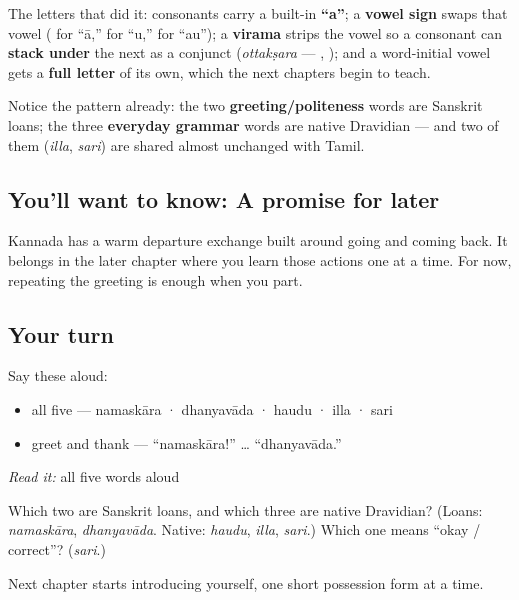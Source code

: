 The letters that did it: consonants carry a built-in \textbf{\textquotedblleft{}a\textquotedblright{}}; a \textbf{vowel sign} swaps that vowel ( for \textquotedblleft{}ā,\textquotedblright{}  for \textquotedblleft{}u,\textquotedblright{}  for \textquotedblleft{}au\textquotedblright{}); a \textbf{virama} strips the vowel so a consonant can \textbf{stack under} the next as a conjunct (\emph{ottakṣara} — , ); and a word-initial vowel gets a \textbf{full letter} of its own, which the next chapters begin to teach.

Notice the pattern already: the two \textbf{greeting/politeness} words are Sanskrit loans; the three \textbf{everyday grammar} words are native Dravidian — and two of them (\emph{illa}, \emph{sari}) are shared almost unchanged with Tamil.

\subsection*{You'll want to know: A promise for later}
Kannada has a warm departure exchange built around going and coming back. It belongs in the later chapter where you learn those actions one at a time. For now, repeating the greeting is enough when you part.

\subsection*{Your turn}
Say these aloud:

\begin{itemize}
\raggedright
  \item all five — namaskāra · dhanyavāda · haudu · illa · sari
  \item greet and thank — \textquotedblleft{}namaskāra!\textquotedblright{} … \textquotedblleft{}dhanyavāda.\textquotedblright{}
\end{itemize}

\begin{tcolorbox}[breakable,colback=teal!4,colframe=teal!35!black,title={Before you move on}]
\emph{Read it:} all five words aloud

Which two are Sanskrit loans, and which three are native Dravidian? (Loans: \emph{namaskāra}, \emph{dhanyavāda}. Native: \emph{haudu}, \emph{illa}, \emph{sari}.) Which one means \textquotedblleft{}okay / correct\textquotedblright{}? (\emph{sari}.)

Next chapter starts introducing yourself, one short possession form at a time.
\end{tcolorbox}
